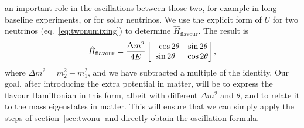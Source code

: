 an important role in the oscillations between those two, for example
in long baseline experiments, or for solar neutrinos.
We use the explicit form of $U$ for two neutrinos (eq.~\ref{eq:twonumixing}) to
determine $\hat{H}_\text{flavour}$. The result is
\begin{equation}\hat{H}_\text{flavour} = \frac{\Delta m^2}{4 E} \begin{bmatrix}-\cos 2\theta & \sin
	2\theta \\ \sin 2\theta & \cos
2\theta\end{bmatrix},\label{eq:flavourvacuum}\end{equation}
where $\Delta m^2 = m_2^2 - m_1^2$, and we have subtracted a multiple of the
identity. Our goal, after introducing the extra potential in matter, will be to
express the flavour Hamiltonian in this form, albeit with different $\Delta
m^2$ and $\theta$, and to relate it to the mass eigenstates in matter. This
will ensure that we can simply apply the steps of section~\ref{sec:twonu} and
directly obtain the oscillation formula.

